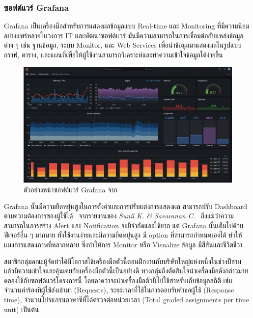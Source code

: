 \documentclass[12pt,one side,openright,a4paper]{cpe-thesis-th}
\newcommand{\thaijustify}[1]{%
  \par\hspace{30pt}\justifying
  #1
}
\begin{document}
\subsubsection{ซอฟต์แวร์ Grafana}
\thaijustify{
  Grafana เป็นเครื่องมือสำหรับการแสดงผลข้อมูลแบบ Real-time และ Monitoring ที่มีความนิยมอย่างแพร่หลายในวงการ IT และพัฒนาซอฟต์แวร์ มันมีความสามารถในการเชื่อมต่อกับแหล่งข้อมูลต่าง ๆ เช่น ฐานข้อมูล, ระบบ Monitor, และ Web Services เพื่อนำข้อมูลมาแสดงผลในรูปแบบกราฟ, ตาราง, และแผนที่เพื่อให้ผู้ใช้งานสามารถวิเคราะห์และทำความเข้าใจข้อมูลได้ง่ายขึ้น~\cite{grafana}
}
\begin{figure}[H]
  \centering
  \includegraphics[width=12cm]{figure/literature/grafana.png}
  \caption[ตัวอย่างหน้าซอฟต์แวร์ Grafana]{ตัวอย่างหน้าซอฟต์แวร์ Grafana จาก~\cite{grafanaoss}}
  \label{fig:lit-grafana}
\end{figure}
\thaijustify{
  Grafana นั้นมีความยืดหยุ่นสูงในการตั้งค่าและการปรับแต่งการแสดงผล สามารถปรับ Dashboard ตามความต้องการของผู้ใช้ได้~\cite{grafana, grafanaoss} จากรายงานของ \textit{Sunil K. \& Savaranan C.}~\cite{sunil21grafana} ถึงแม้ว่าความสามารถในการสร้าง Alert และ Notification จะมีจำกัดและใช้ยาก แต่ Grafana นั้นเต็มไปด้วยฟีเจอร์อื่น ๆ มากมาย ทั้งใช้งานง่ายและมีความยืดหยุ่นสูง มี option ที่สามารถกำหนดเองได้ ทำให้แผงการแสดงภาพที่หลากหลาย ซึ่งทำให้การ Monitor หรือ Visualize ข้อมูล มีสีสันและชีวิตชีวา
}
\thaijustify{
  สมาชิกกลุ่มคณะผู้จัดทำได้มีโอกาสใช้เครื่องมือตัวนี้ตอนฝึกงานกับบริษัทใหญ่แห่งหนึ่งในช่วงปีสาม แล้วมีความเข้าใจและคุ้นเคยกับเครื่องมือตัวนี้เป็นอย่างดี ทางกลุ่มถึงตัดสินใจนำเครื่องมือดังกล่าวมาทดลองใช้กับซอฟต์แวร์โครงการนี้ โดยคาดว่าจะนำเครื่องมือตัวนี้ไปใช้สำหรับเก็บข้อมูลสถิติ เช่น จำนวนคำร้องที่ผู้ใช้ส่งเข้ามา (Requests), ระยะเวลาที่ใช้ในการตอบรับคำขอผู้ใช้ (Response time), จำนวนโปรแกรมภาษาซีที่ได้ตรวจต่อหน่วยเวลา (Total graded assignments per time unit) เป็นต้น
}
\end{document}
